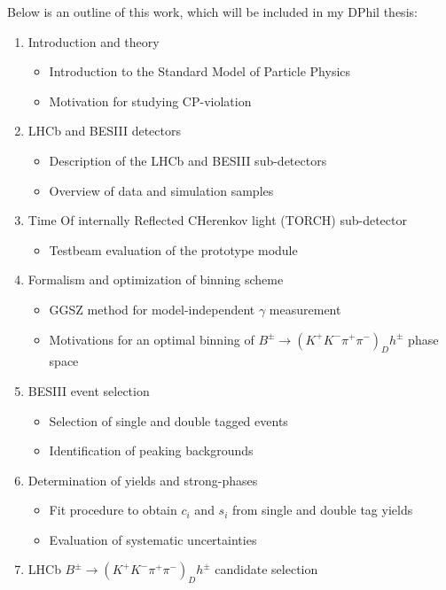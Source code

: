 \documentclass[12pt, a4paper, notitlepage, onecolumn]{article}
\begin{document}
Below is an outline of this work, which will be included in my DPhil thesis:
\begin{enumerate}
  \item{Introduction and theory}
  \begin{itemize}
    \item{Introduction to the Standard Model of Particle Physics}
    \item{Motivation for studying CP-violation}
  \end{itemize}
  \item{LHCb and BESIII detectors}
  \begin{itemize}
    \item{Description of the LHCb and BESIII sub-detectors}
    \item{Overview of data and simulation samples}
  \end{itemize}
  \item{Time Of internally Reflected CHerenkov light (TORCH) sub-detector}
  \begin{itemize}
    \item{Testbeam evaluation of the prototype module}
  \end{itemize}
  \item{Formalism and optimization of binning scheme}
  \begin{itemize}
    \item{GGSZ method for model-independent $\gamma$ measurement}
    \item{Motivations for an optimal binning of $B^\pm\to(K^+K^-\pi^+\pi^-)_Dh^\pm$ phase space}
  \end{itemize}
  \item{BESIII event selection}
  \begin{itemize}
    \item{Selection of single and double tagged events}
    \item{Identification of peaking backgrounds}
  \end{itemize}
  \item{Determination of yields and strong-phases}
  \begin{itemize}
    \item{Fit procedure to obtain $c_i$ and $s_i$ from single and double tag yields}
    \item{Evaluation of systematic uncertainties}
  \end{itemize}
  \item{LHCb $B^\pm\to(K^+K^-\pi^+\pi^-)_Dh^\pm$ candidate selection}
  \begin{itemize}

\end{itemize}
\end{enumerate}
\end{document}
